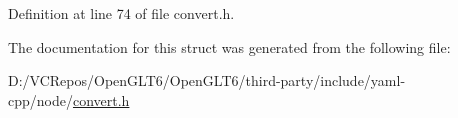 Definition at line 74 of file convert.\+h.



The documentation for this struct was generated from the following file\+:\begin{DoxyCompactItemize}
\item 
D\+:/\+V\+C\+Repos/\+Open\+G\+L\+T6/\+Open\+G\+L\+T6/third-\/party/include/yaml-\/cpp/node/\mbox{\hyperlink{convert_8h}{convert.\+h}}\end{DoxyCompactItemize}

